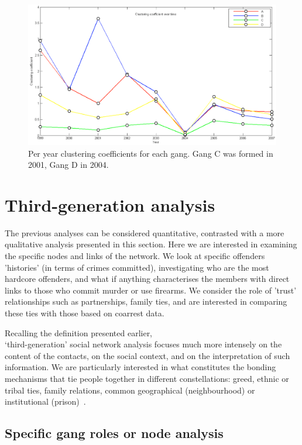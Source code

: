 \documentclass[twocolumn]{svjour3}          %
\theoremstyle{definition}
\begin{document}
\begin{figure}[htb]
\centering
\includegraphics[width=\columnwidth]{images/gangscc1years}
\caption{Per year clustering coefficients for each gang. Gang C was formed in 2001, Gang D in 2004.} 
\label{fig:gangscc1years}
\end{figure}



\section{Third-generation analysis}\label{sec:thirdanalysis}

The previous analyses can be considered quantitative, contrasted with
a more qualitative analysis presented in this section. Here we are
interested in examining the specific nodes and links of the
network. We look at specific offenders 'histories' (in terms of crimes
committed), investigating who are the most hardcore offenders, and
what if anything characterises the members with direct links to those
who commit murder or use firearms. We consider the role of 'trust'
relationships such as partnerships, family ties, and are interested in
comparing these ties with those based on coarrest data.

Recalling the definition presented earlier,\\`third-generation' social
network analysis focuses much more intensely on the content of the
contacts, on the social context, and on the interpretation of such
information. We are particularly interested in what constitutes the
bonding mechanisms that tie people together in different
constellations: greed, ethnic or tribal ties, family relations, common
geographical (neighbourhood) or institutional
(prison)~\citep{Klerks2001}.


\subsection{Specific gang roles or node analysis}\label{sec:shortestpaths}
\end{document}
